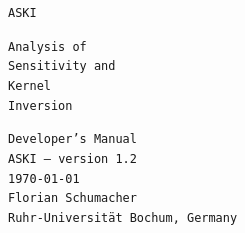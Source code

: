 \begin{titlepage}
\thispagestyle{empty}

  \begin{center}
    \tt \Huge ASKI
  \end{center}
  \vspace*{2cm}

  \begin{minipage}{0.5\textwidth}
    \begin{flushleft}
      \fontsize{20}{40} \selectfont
      {\tt {\Huge A}{\large nalysis of} \\ {\Huge S}{\large ensitivity and } \\ {\Huge\tt K}{\large ernel} \\ {\Huge\tt I}{\large nversion} }
    \end{flushleft}
  \end{minipage}
  \hfill
  \begin{minipage}{0.5\textwidth}
    \begin{flushright}
      {\fontsize{20}{40} \selectfont \tt {\LARGE Developer's Manual} \\  ASKI {\rm --} {\large version 1.2} \\ {\large \mydate \today} \\}
      {\tt {\large Florian Schumacher} \\ {\small Ruhr-Universit\"at Bochum, Germany} }
    \end{flushright}
  \end{minipage}

\vspace*{0.5cm}


\end{titlepage}
